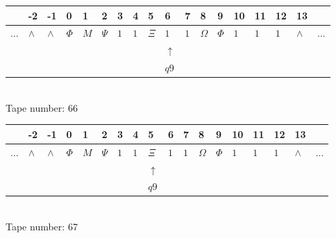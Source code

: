 \documentclass[11pt]{article}
\begin{document}
\begin{table}[H]
\centering
\begin{tabular}{llllllllllllllllll}
 & -2 & -1 & 0 & 1 & 2 & 3 & 4 & 5 & 6 & 7 & 8 & 9 & 10 & 11 & 12 & 13 & \\
\hline
$...$ & \multicolumn{1}{|l|}{$\wedge$} & \multicolumn{1}{|l|}{$\wedge$} & \multicolumn{1}{|l|}{$\Phi$} & \multicolumn{1}{|l|}{$M$} & \multicolumn{1}{|l|}{$\Psi$} & \multicolumn{1}{|l|}{$1$} & \multicolumn{1}{|l|}{$1$} & \multicolumn{1}{|l|}{$\Xi$} & \multicolumn{1}{|l|}{$1$} & \multicolumn{1}{|l|}{$1$} & \multicolumn{1}{|l|}{$\Omega$} & \multicolumn{1}{|l|}{$\Phi$} & \multicolumn{1}{|l|}{$1$} & \multicolumn{1}{|l|}{$1$} & \multicolumn{1}{|l|}{$1$} & \multicolumn{1}{|l|}{$\wedge$} & $...$\\
\hline
&  &  &  &  &  &  &  &  & $\uparrow$ &  &  &  &  &  &  &  &  \\
&  &  &  &  &  &  &  &  & $ q9 $ &  &  &  &  &  &  &  &  \\
\end{tabular}
\\
Tape number: 66
\noindent\makebox[\linewidth]{\hdashrule{\textwidth}{1pt}{1pt}}\end{table}

\begin{table}[H]
\centering
\begin{tabular}{llllllllllllllllll}
 & -2 & -1 & 0 & 1 & 2 & 3 & 4 & 5 & 6 & 7 & 8 & 9 & 10 & 11 & 12 & 13 & \\
\hline
$...$ & \multicolumn{1}{|l|}{$\wedge$} & \multicolumn{1}{|l|}{$\wedge$} & \multicolumn{1}{|l|}{$\Phi$} & \multicolumn{1}{|l|}{$M$} & \multicolumn{1}{|l|}{$\Psi$} & \multicolumn{1}{|l|}{$1$} & \multicolumn{1}{|l|}{$1$} & \multicolumn{1}{|l|}{$\Xi$} & \multicolumn{1}{|l|}{$1$} & \multicolumn{1}{|l|}{$1$} & \multicolumn{1}{|l|}{$\Omega$} & \multicolumn{1}{|l|}{$\Phi$} & \multicolumn{1}{|l|}{$1$} & \multicolumn{1}{|l|}{$1$} & \multicolumn{1}{|l|}{$1$} & \multicolumn{1}{|l|}{$\wedge$} & $...$\\
\hline
&  &  &  &  &  &  &  & $\uparrow$ &  &  &  &  &  &  &  &  &  \\
&  &  &  &  &  &  &  & $ q9 $ &  &  &  &  &  &  &  &  &  \\
\end{tabular}
\\
Tape number: 67
\noindent\makebox[\linewidth]{\hdashrule{\textwidth}{1pt}{1pt}}\end{table}
\end{document}
